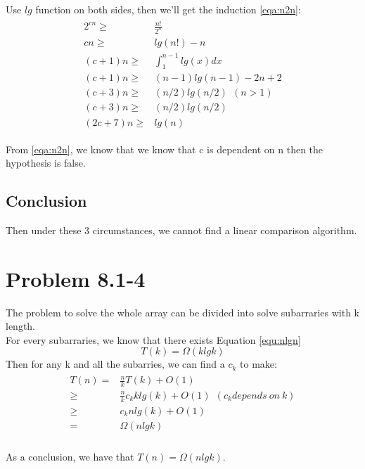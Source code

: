 \documentclass[oneside]{homework} %
\begin{document}
Use $lg$ function on both sides, then we'll get the induction \ref{eqa:n2n}:
\begin{eqnarray}
  \begin{split}
	2^{cn} \geq& \frac{n!}{2^{n}}  \\
	cn \geq& lg(n!) - n \\
	(c+1)n \geq& \int_{1}^{n-1}lg(x)dx  \\
	(c+1)n \geq& (n-1)lg(n-1) - 2n +2 \\
	(c+3)n \geq& (n/2)lg(n/2) ~ ~ (n>1)\\
	(c+3)n \geq& (n/2)lg(n/2) \\
	(2c+7)n \geq& lg(n)
  \end{split}
  \label{eqa:n2n}
\end{eqnarray}

From \ref{eqa:n2n}, we know that we know that c is dependent on n then the hypothesis is false.

\subsection{Conclusion}
Then under these 3 circumstances, we cannot find a linear comparison algorithm.


\section{Problem 8.1-4}
The problem to solve the whole array can be divided into solve subarraries with k length.\\ For every subarraries, we know that there exists Equation \ref{equ:nlgn}
\begin{equation}
  T(k) = \Omega (klgk)
  \label{equ:nlgn}
\end{equation}
Then for any k and all the subarries, we can find a $c_{k}$ to make:
\begin{eqnarray}
  \begin{split}
	T(n)=& \frac{n}{k} T(k) +O(1)  \\
	\geq& \frac{n}{k} c_{k}klg(k) +O(1) ~ ~ (c_{k} depends ~ on ~  k) \\
	\geq& c_{k}nlg(k) +O(1) ~ \\
	=&  \Omega(nlgk) \\
  \end{split}
  \label{equa:nlgk}
\end{eqnarray}

As a conclusion, we have that $T(n) = \Omega(nlgk)$.
\end{document}
